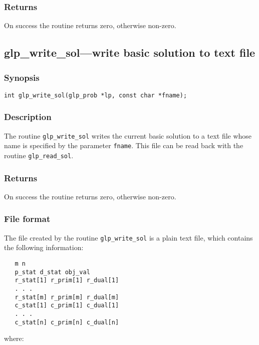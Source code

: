 \subsubsection*{Returns}

On success the routine returns zero, otherwise non-zero.

\newpage

\subsection{glp\_write\_sol---write basic solution to text file}

\subsubsection*{Synopsis}

\begin{verbatim}
int glp_write_sol(glp_prob *lp, const char *fname);
\end{verbatim}

\subsubsection*{Description}

The routine \verb|glp_write_sol| writes the current basic solution to a
text file whose name is specified by the parameter \verb|fname|. This
file can be read back with the routine \verb|glp_read_sol|.

\subsubsection*{Returns}

On success the routine returns zero, otherwise non-zero.

\subsubsection*{File format}

The file created by the routine \verb|glp_write_sol| is a plain text
file, which contains the following information:

\begin{verbatim}
   m n
   p_stat d_stat obj_val
   r_stat[1] r_prim[1] r_dual[1]
   . . .
   r_stat[m] r_prim[m] r_dual[m]
   c_stat[1] c_prim[1] c_dual[1]
   . . .
   c_stat[n] c_prim[n] c_dual[n]
\end{verbatim}

\noindent
where:

